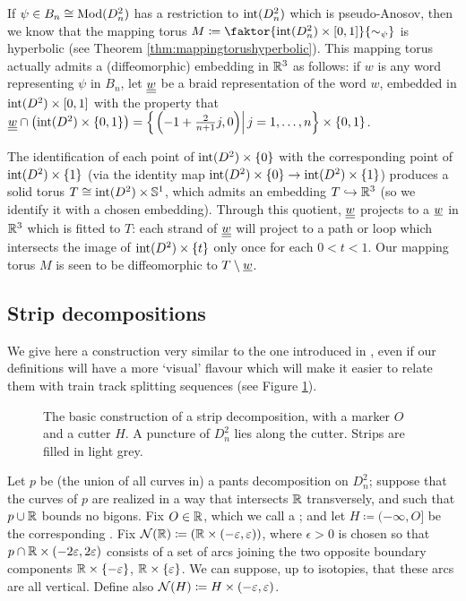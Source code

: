 If $\psi\in B_n\cong \mathrm{Mod}(D^2_n)$ has a restriction to $\mathrm{int}(D^2_n)$ which is pseudo-Anosov, then we know that the mapping torus $M\coloneqq \faktor{\inte(D^2_n)\times [0,1]}{\sim_\psi}$ is hyperbolic (see Theorem \ref{thm:mappingtorushyperbolic}). This mapping torus actually admits a (diffeomorphic) embedding in $\mathbb R^3$ as follows: if $w$ is any word representing $\psi$ in $B_n$, let $\underline{\underline{w}}$ be a braid representation of the word $w$, embedded in $\mathrm{int}(D^2)\times [0,1]$ with the property that $\underline{\underline{w}}\cap \left(\mathrm{int}(D^2)\times\{0,1\}\right)= \left\{\left.\left(-1+\frac{2}{n+1}j,0\right) \right|j=1,\ldots,n\right\}\times\{0,1\}$.

The identification of each point of $\mathrm{int}(D^2)\times\{0\}$ with the corresponding point of $\mathrm{int}(D^2)\times\{1\}$ (via the identity map $\mathrm{int}(D^2)\times\{0\}\rightarrow \mathrm{int}(D^2)\times\{1\}$) produces a solid torus $T\cong \mathrm{int}(D^2)\times\mathbb S^1$, which admits an embedding $T\hookrightarrow \mathbb R^3$ (so we identify it with a chosen embedding). Through this quotient, $\underline{\underline{w}}$ projects to a  $\underline{w}$ in $\mathbb R^3$ which is fitted to $T$: each strand of $\underline{\underline{w}}$ will project to a path or loop which intersects the image of $\mathrm{int}(D^2)\times\{t\}$ only once for each $0<t<1$. Our mapping torus $M$ is seen to be diffeomorphic to $T\setminus\underline{w}$.


\subsection{Strip decompositions}

We give here a construction very similar to the one introduced in \cite{dynnikovwiest}, even if our definitions will have a more `visual' flavour which will make it easier to relate them with train track splitting sequences (see Figure \ref{fig:stripdecomposition}).

\begin{figure}
\def\svgwidth{.65\textwidth}
\centering{}
\caption{\label{fig:stripdecomposition}The basic construction of a strip decomposition, with a marker $O$ and a cutter $H$. A puncture of $D^2_n$ lies along the cutter. Strips are filled in light grey.}
\end{figure}

Let $p$ be (the union of all curves in) a pants decomposition on $D^2_n$; suppose that the curves of $p$ are realized in a way that intersects $\mathbb R$ transversely, and such that $p\cup\mathbb R$ bounds no bigons. Fix $O\in \mathbb R$, which we call a ; and let $H\coloneqq (-\infty,O]$ be the corresponding . Fix ${\mathcal N}(\mathbb R)\coloneqq\left(\mathbb R \times (-\varepsilon,\varepsilon)\right)$, where $\epsilon>0$ is chosen so that $p\cap \mathbb R \times (-2\varepsilon,2\varepsilon)$ consists of a set of arcs joining the two opposite boundary components $\mathbb R\times\{-\varepsilon\}$, $\mathbb R\times\{\varepsilon\}$. We can suppose, up to isotopies, that these arcs are all vertical. Define also ${\mathcal N}(H)\coloneqq H \times (-\varepsilon, \varepsilon)$.

